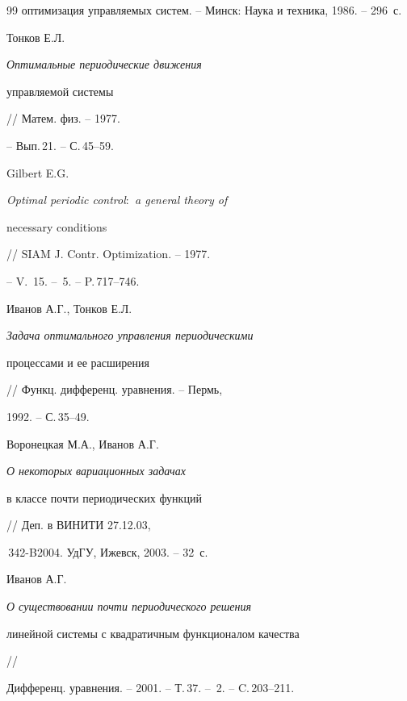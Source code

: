 \begin{thebibliography}{99}
{оптимизация управляемых систем}. -- Минск: Наука и техника, 1986. -- 296~с.




Тонков Е.Л. {\em Оптимальные периодические движения


управляемой системы} // Матем. физ. -- 1977.


-- Вып.\,21. -- С.\,45--59.




Gilbert E.G. {\em Optimal periodic control\/${:}$ a general theory of


necessary conditions} // SIAM J. Contr. Optimization. -- 1977. 


-- V.~15. -- \No\,5. -- P.\,717--746.




Иванов А.Г., Тонков Е.Л. {\em Задача оптимального управления периодическими


процессами и ее расширения} // Функц. дифференц. уравнения. -- Пермь,


1992. -- С.\,35--49.




Воронецкая М.А., Иванов А.Г. {\em О некоторых вариационных задачах


в классе почти периодических функций} // Деп. в ВИНИТИ 27.12.03, 


\No\,342-B2004. УдГУ, Ижевск, 2003. -- 32~с.




Иванов А.Г. {\em О существовании почти периодического решения


линейной системы с квадратичным функционалом качества} //


Дифференц. уравнения. -- 2001. -- Т.\,37. -- \No\,2. -- C.\,203--211.





\end{thebibliography}


